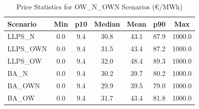 \begin{table}[htbp]
\centering
\caption{Price Statistics for OW\_N\_OWN Scenarios (€/MWh)}
\label{tab:price_stats_ow_n_own}
\begin{tabular}{lcccccc}
\hline
\textbf{Scenario} & \textbf{Min} & \textbf{p10} & \textbf{Median} & \textbf{Mean} & \textbf{p90} & \textbf{Max} \\
\hline
LLPS_N & 0.0 & 9.4 & 30.8 & 43.1 & 87.9 & 1000.0 \\
LLPS_OWN & 0.0 & 9.4 & 31.5 & 43.4 & 87.2 & 1000.0 \\
LLPS_OW & 0.0 & 9.4 & 32.0 & 48.4 & 89.3 & 1000.0 \\
BA_N & 0.0 & 9.4 & 30.2 & 39.7 & 80.2 & 1000.0 \\
BA_OWN & 0.0 & 9.4 & 29.9 & 39.5 & 79.0 & 1000.0 \\
BA_OW & 0.0 & 9.4 & 31.7 & 43.4 & 81.8 & 1000.0 \\
\hline
\end{tabular}
\end{table}